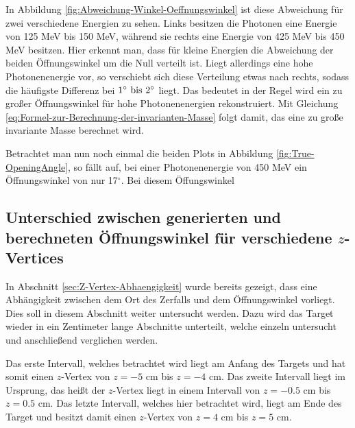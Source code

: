 \documentclass[a4paper,11pt,oneside,final,german,openbib,pdftex]{scrbook}
\begin{document}
{In Abbildung \ref{fig:Abweichung-Winkel-Oeffnungswinkel} ist diese Abweichung f\"ur zwei verschiedene Energien zu sehen. Links besitzen die Photonen eine Energie von 125 MeV bis 150 MeV, w\"ahrend sie rechts eine Energie von 425 MeV bis 450 MeV besitzen. Hier erkennt man, dass f\"ur kleine Energien die Abweichung der beiden \"Offnungswinkel um die Null verteilt ist. Liegt allerdings eine hohe Photonenenergie vor, so verschiebt sich diese Verteilung etwas nach rechts, sodass die h\"aufigste Differenz bei $1^{\circ} \textnormal{ bis } 2^{\circ}$ liegt. Das bedeutet in der Regel wird ein zu gro{\ss}er \"Offnungswinkel f\"ur hohe Photonenenergien rekonstruiert. Mit Gleichung \ref{eq:Formel-zur-Berechnung-der-invarianten-Masse} folgt damit, das eine zu gro{\ss}e invariante Masse berechnet wird.

Betrachtet man nun noch einmal die beiden Plots in Abbildung \ref{fig:True-OpeningAngle}, so f\"allt auf, bei einer Photonenenergie von 450 MeV ein \"Offnungswinkel von nur 17$^{\circ}$. Bei diesem \"Offungswinkel





 
 


\subsection{Unterschied zwischen generierten und berechneten \"Offnungswinkel f\"ur verschiedene $z$-Vertices}
\label{sec:Unterschied-Oeffnungswinkel-ZVertex}

In Abschnitt \ref{sec:Z-Vertex-Abhaengigkeit} wurde bereits gezeigt, dass eine Abh\"angigkeit zwischen dem Ort des Zerfalls und dem \"Offnungswinkel vorliegt. Dies soll in diesem Abschnitt weiter untersucht werden. Dazu wird das Target wieder in ein Zentimeter lange Abschnitte unterteilt, welche einzeln untersucht und anschlie{\ss}end verglichen werden.

Das erste Intervall, welches betrachtet wird liegt am Anfang des Targets und hat somit einen $z$-Vertex von $z=-5$ cm bis $z=-4$ cm. Das zweite Intervall liegt im Ursprung, das hei{\ss}t der $z$-Vertex liegt in einem Intervall von $z= -0.5$ cm bis $z = 0.5$ cm. Das letzte Intervall, welches hier betrachtet wird, liegt am Ende des Target und besitzt damit einen $z$-Vertex von $z= 4$ cm bis $z= 5$ cm.

}
\end{document}
